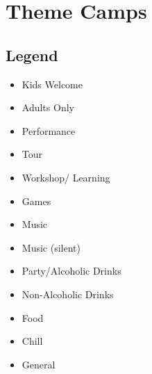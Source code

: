 %
%

\chapter{Theme Camps}
\label{ch:themecamps}


\section*{Legend}
\begin{multicols}{2}
\begin{itemize}
   \item[\faChild] Kids Welcome
   \item[\faUserAstronaut] Adults Only 
   \item[\faTheaterMasks] Performance
   \item[\faIcon{bus-alt}] Tour
   \item[\faGraduationCap] Workshop/ Learning
   \item[\faDice] Games 
   \item[\faMusic] Music
   \item[\faHeadphones] Music (silent)
   \item[\faIcon{glass-martini-alt}] Party/\-Alcoholic Drinks
   \item[\faCoffee] Non-Alcoholic Drinks
   \item[\faPizzaSlice] Food
   \item[\faUmbrellaBeach] Chill 
   \item[{\faIcon[regular]{calendar-alt}}] General
\end{itemize}
\end{multicols}










